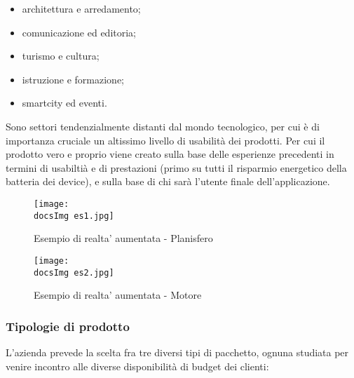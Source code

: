 \begin{itemize}
	\item architettura e arredamento;
	\item comunicazione ed editoria;
	\item turismo e cultura;
	\item istruzione e formazione;
	\item smartcity ed eventi.
\end{itemize}

Sono settori tendenzialmente distanti dal mondo tecnologico, per cui \`e di importanza cruciale un altissimo livello di usabilit\`a dei prodotti. Per cui il prodotto vero e proprio viene creato sulla base delle esperienze precedenti in termini di usabilti\`a e di prestazioni (primo su tutti il risparmio energetico della batteria dei device), e sulla base di chi sar\`a l'utente finale dell'applicazione.

\begin{figure}[H]
	\centering
	\texttt{[image: \\docsImg es1.jpg]}
	\caption{Esempio di realta' aumentata - Planisfero}
	\label{fig:Esempio di realta' aumentata presente nell'app Experenti - Planisfero}
\end{figure}

\begin{figure}[H]
	\centering
	\texttt{[image: \\docsImg es2.jpg]}
	\caption{Esempio di realta' aumentata - Motore}
	\label{fig:Esempio di realta' aumentata presente nell'app Experenti - Motore}
\end{figure}


\subsubsection{Tipologie di prodotto}
L'azienda prevede la scelta fra tre diversi tipi di pacchetto, ognuna studiata per venire incontro alle diverse disponibilit\`a di budget dei clienti:

